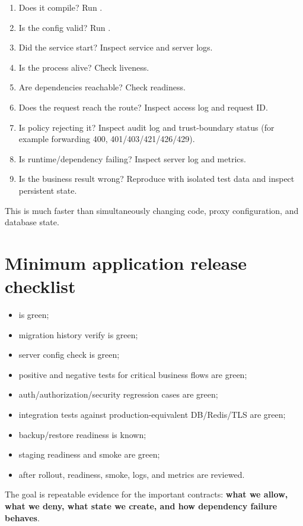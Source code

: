 \begin{enumerate}
  \item Does it compile? Run .
  \item Is the config valid? Run .
  \item Did the service start? Inspect service and server logs.
  \item Is the process alive? Check liveness.
  \item Are dependencies reachable? Check readiness.
  \item Does the request reach the route? Inspect access log and request ID.
  \item Is policy rejecting it? Inspect audit log and trust-boundary status (for example forwarding 400, 401/403/421/426/429).
  \item Is runtime/dependency failing? Inspect server log and metrics.
  \item Is the business result wrong? Reproduce with isolated test data and inspect persistent state.
\end{enumerate}

This is much faster than simultaneously changing code, proxy configuration, and database state.

\section{Minimum application release checklist}

\begin{itemize}
  \item {} is green;
  \item migration history verify is green;
  \item server config check is green;
  \item positive and negative tests for critical business flows are green;
  \item auth/authorization/security regression cases are green;
  \item integration tests against production-equivalent DB/Redis/TLS are green;
  \item backup/restore readiness is known;
  \item staging readiness and smoke are green;
  \item after rollout, readiness, smoke, logs, and metrics are reviewed.
\end{itemize}

The goal is repeatable evidence for the important contracts: \textbf{what we allow, what we deny, what state we create, and how dependency failure behaves}.

